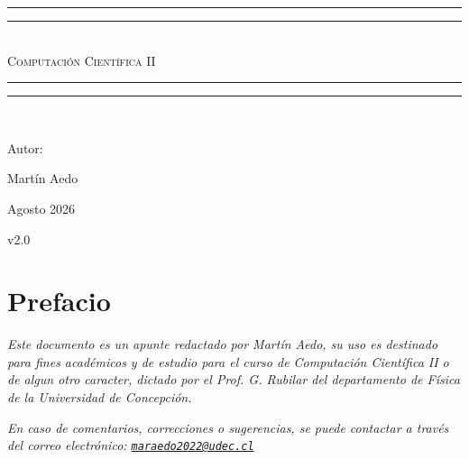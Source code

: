 \documentclass[letterpaper,twoside,12pt]{report}
\newlength{\drop}
\newcommand{\email}[1]{\href{mailto:#1}{\texttt{#1}}}
\theoremstyle{definition}
\begin{document}
\sffamily
\begin{titlepage}
 \textheight
    \centering
    \vspace*{\baselineskip}
    \rule{\textwidth}{1.6pt}\vspace*{-\baselineskip}\vspace*{2pt}
    \rule{\textwidth}{0.4pt}\\[\baselineskip]
    {\rmfamily\scshape\Huge Computación Científica II}\\[0.2\baselineskip]
    \rule{\textwidth}{0.4pt}\vspace*{-\baselineskip}\vspace{3.2pt}
    \rule{\textwidth}{1.6pt}\\[\baselineskip]
    {\Large Autor: \par}
{\Large Martín Aedo \par}
\vfill
{\large Agosto 2026 \par}
{\large v2.0 \par}
\end{titlepage}

\chapter*{Prefacio}


\emph{Este documento es un apunte redactado por Martín Aedo, su uso es destinado para fines académicos y de estudio para el curso de Computación Científica II o de algun otro caracter, dictado por el Prof. G. Rubilar del departamento de Física de la Universidad de Concepción.}

\emph{En caso de comentarios, correcciones o sugerencias, se puede contactar a través del correo electrónico: \email{maraedo2022@udec.cl}}
\tableofcontents

\pagestyle{mystyle}



\nocite{*} %


\end{document}
